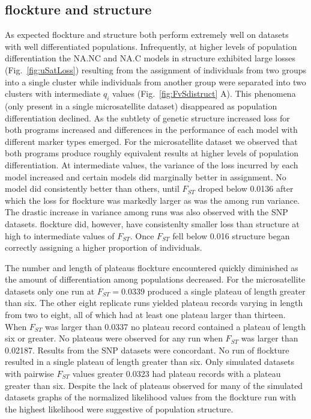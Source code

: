 \subsection*{{\sc flockture} and {\sc structure}} 
As expected {\sc flockture} and {\sc structure} both perform extremely well on datasets with
well differentiated populations. Infrequently, at higher levels of population differentiation the 
NA.NC and NA.C models in {\sc structure} exhibited large losses (Fig.~\ref{fig:uSatLoss})
resulting from the assignment of individuals from two groups into a single cluster while 
individuals from another group were separated into two clusters
with intermediate $q_i$ values (Fig.~\ref{fig:FvSdistruct}  A). This phenomena 
(only present in a single microsatellite dataset) disappeared as population differentiation 
declined. As the subtlety of genetic structure 
increased loss for both programs increased and differences in the performance of
each model with different marker types emerged.
For the microsatellite dataset we observed that both programs
produce roughly equivalent results at higher levels of population differentiation. At intermediate 
values, the variance of the loss incurred by each model increased and certain models did marginally
better in assignment. No model did consistently better than others, until $F_{ST}$ droped 
below 0.0136 after which the loss for {\sc flockture} was markedly larger as was the among run
variance. The drastic increase in variance among runs was also observed with the SNP datasets. 
 {\sc flockture} did, however, have consistenlty smaller loss than  {\sc structure} at high to intermediate 
values of $F_{ST}$. Once $F_{ST}$ fell below 0.016 {\sc structure} began correctly assigning a 
higher proportion of individuals. 

The number and length of plateaus {\sc flockture} encountered quickly 
diminished as the amount of differentiation among populations decreased. For the microsatellite datasets
only one run at $F_{ST} = 0.0339$ produced a single plateau of length greater than six. The other eight 
replicate runs yielded plateau records varying in length from two to eight, all of which had at 
least one plateau larger than thirteen. When $F_{ST}$ was larger than 0.0337 no plateau record
contained a plateau of length six or greater. No plateaus were observed for any run when 
$F_{ST}$ was larger than 0.02187. Results from the SNP datasets
were concordant. No run of {\sc flockture} resulted in a single plateau of length greater than six.
Only simulated datasets with pairwise $F_{ST}$ values greater 0.0323 had plateau records with a 
plateau greater than six. Despite the lack of plateaus observed for many of the simulated datasets 
graphs of the normalized likelihood values from the {\sc flockture} run with the highest 
likelihood were suggestive of population structure.  

